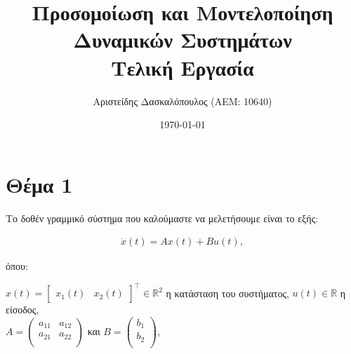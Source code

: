 \documentclass[12pt]{article} %
\title{\textbf{Προσομοίωση και Μοντελοποίηση \\ Δυναμικών Συστημάτων} \\ Τελική Εργασία}
\author{Αριστείδης Δασκαλόπουλος (ΑΕΜ: 10640)}
\date{\today}
\numberwithin{equation}{section}  %
\begin{document}
\maketitle


\renewcommand{\contentsname}{Περιεχόμενα}
\tableofcontents
\newpage
{}


\section{Θέμα 1}


Το δοθέν γραμμικό σύστημα που καλούμαστε να μελετήσουμε είναι το εξής:

\vspace{-20pt}

\begin{align}\label{eq:sys_eq_1}
    \dot{x}(t) = A x(t) + B u(t),
\end{align}

\vspace{-\topsep}

\noindent όπου: 

\vspace{-\topsep}

\begin{center}
    $x(t) = \begin{bmatrix}x_1(t) & x_2(t)\end{bmatrix}^\top \in \mathbb{R}^2$ η κατάσταση του συστήματος, \hspace{0.5cm}
    $u(t) \in \mathbb{R}$ η είσοδος, \hspace{0.5cm} \\
    $A = \begin{pmatrix}
        a_{11} & a_{12} \\
        a_{21} & a_{22} \\
        \end{pmatrix}$ \hspace{0.25cm} και \hspace{0.25cm}
    $B = \begin{pmatrix}
        b_{1} \\
        b_{2} \\
        \end{pmatrix}$,
\end{center}
\end{document}
